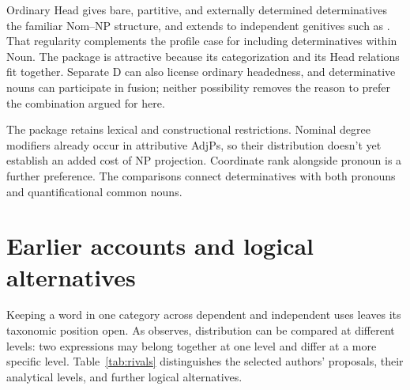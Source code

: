 \documentclass[12pt]{article}
\begin{document}
Ordinary Head gives bare, partitive, and externally determined determinatives the familiar Nom--NP structure, and extends to independent genitives such as . That regularity complements the profile case for including determinatives within Noun. The package is attractive because its categorization and its Head relations fit together. Separate D can also license ordinary headedness, and determinative nouns can participate in fusion; neither possibility removes the reason to prefer the combination argued for here.

The package retains lexical and constructional restrictions. Nominal degree modifiers already occur in attributive AdjPs, so their distribution doesn't yet establish an added cost of NP projection. Coordinate rank alongside pronoun is a further preference. The comparisons connect determinatives with both pronouns and quantificational common nouns.

\appendix

\section{Earlier accounts and logical alternatives}\label{sec:historical}

Keeping a word in one category across dependent and independent uses leaves its taxonomic position open. As \textcite[232--235]{lyons1968} observes, distribution can be compared at different levels: two expressions may belong together at one level and differ at a more specific level. Table~\ref{tab:rivals} distinguishes the selected authors' proposals, their analytical levels, and further logical alternatives.
\end{document}
